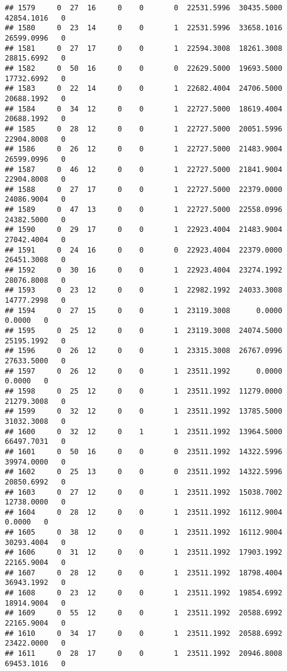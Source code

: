 \documentclass[
]{article}
\begin{document}
\begin{enumerate}
\begin{verbatim}
## 1579     0  27  16     0    0       0  22531.5996  30435.5000  42854.1016   0
## 1580     0  23  14     0    0       1  22531.5996  33658.1016  26599.0996   0
## 1581     0  27  17     0    0       1  22594.3008  18261.3008  28815.6992   0
## 1582     0  50  16     0    0       0  22629.5000  19693.5000  17732.6992   0
## 1583     0  22  14     0    0       1  22682.4004  24706.5000  20688.1992   0
## 1584     0  34  12     0    0       1  22727.5000  18619.4004  20688.1992   0
## 1585     0  28  12     0    0       1  22727.5000  20051.5996  22904.8008   0
## 1586     0  26  12     0    0       1  22727.5000  21483.9004  26599.0996   0
## 1587     0  46  12     0    0       1  22727.5000  21841.9004  22904.8008   0
## 1588     0  27  17     0    0       1  22727.5000  22379.0000  24086.9004   0
## 1589     0  47  13     0    0       1  22727.5000  22558.0996  24382.5000   0
## 1590     0  29  17     0    0       1  22923.4004  21483.9004  27042.4004   0
## 1591     0  24  16     0    0       0  22923.4004  22379.0000  26451.3008   0
## 1592     0  30  16     0    0       1  22923.4004  23274.1992  28076.8008   0
## 1593     0  23  12     0    0       1  22982.1992  24033.3008  14777.2998   0
## 1594     0  27  15     0    0       1  23119.3008      0.0000      0.0000   0
## 1595     0  25  12     0    0       1  23119.3008  24074.5000  25195.1992   0
## 1596     0  26  12     0    0       1  23315.3008  26767.0996  27633.5000   0
## 1597     0  26  12     0    0       1  23511.1992      0.0000      0.0000   0
## 1598     0  25  12     0    0       1  23511.1992  11279.0000  21279.3008   0
## 1599     0  32  12     0    0       1  23511.1992  13785.5000  31032.3008   0
## 1600     0  32  12     0    1       1  23511.1992  13964.5000  66497.7031   0
## 1601     0  50  16     0    0       0  23511.1992  14322.5996  39974.0000   0
## 1602     0  25  13     0    0       0  23511.1992  14322.5996  20850.6992   0
## 1603     0  27  12     0    0       1  23511.1992  15038.7002  12738.0000   0
## 1604     0  28  12     0    0       1  23511.1992  16112.9004      0.0000   0
## 1605     0  38  12     0    0       1  23511.1992  16112.9004  30293.4004   0
## 1606     0  31  12     0    0       1  23511.1992  17903.1992  22165.9004   0
## 1607     0  28  12     0    0       1  23511.1992  18798.4004  36943.1992   0
## 1608     0  23  12     0    0       1  23511.1992  19854.6992  18914.9004   0
## 1609     0  55  12     0    0       1  23511.1992  20588.6992  22165.9004   0
## 1610     0  34  17     0    0       1  23511.1992  20588.6992  23422.0000   0
## 1611     0  28  17     0    0       1  23511.1992  20946.8008  69453.1016   0

\end{verbatim}
\end{enumerate}
\end{document}
